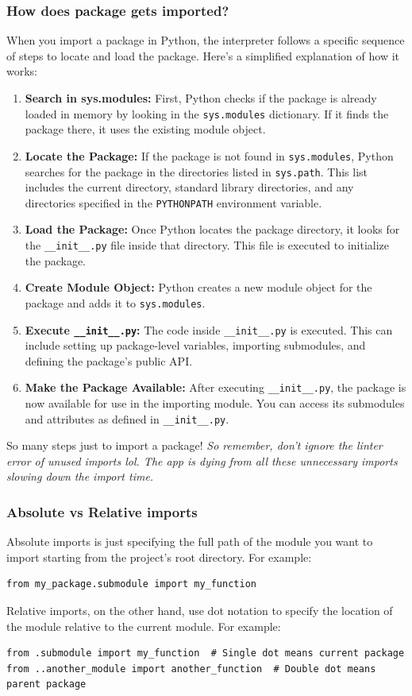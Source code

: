 \subsubsection{How does package gets imported?}
When you import a package in Python, the interpreter follows a specific sequence of steps to locate and load the package. Here's a simplified explanation of how it works:
\begin{enumerate}
    \item \textbf{Search in sys.modules:} First, Python checks if the package is already loaded in memory by looking in the \texttt{sys.modules} dictionary. If it finds the package there, it uses the existing module object.
    \item \textbf{Locate the Package:} If the package is not found in \texttt{sys.modules}, Python searches for the package in the directories listed in \texttt{sys.path}. This list includes the current directory, standard library directories, and any directories specified in the \texttt{PYTHONPATH} environment variable.
    \item \textbf{Load the Package:} Once Python locates the package directory, it looks for the \texttt{\_\_init\_\_.py} file inside that directory. This file is executed to initialize the package.
    \item \textbf{Create Module Object:} Python creates a new module object for the package and adds it to \texttt{sys.modules}.
    \item \textbf{Execute \texttt{\_\_init\_\_.py}:} The code inside \texttt{\_\_init\_\_.py} is executed. This can include setting up package-level variables, importing submodules, and defining the package's public API.
    \item \textbf{Make the Package Available:} After executing \texttt{\_\_init\_\_.py}, the package is now available for use in the importing module. You can access its submodules and attributes as defined in \texttt{\_\_init\_\_.py}.
\end{enumerate}

So many steps just to import a package! \textit{So remember, don't ignore the linter error of unused imports lol. The app is dying from all these unnecessary imports slowing down the import time.}

\subsubsection{Absolute vs Relative imports}
Absolute imports is just specifying the full path of the module you want to import starting from the project's root directory. For example:
\begin{lstlisting}[caption=Absolute Import Example]
from my_package.submodule import my_function
\end{lstlisting}
Relative imports, on the other hand, use dot notation to specify the location of the module relative to the current module. For example:
\begin{lstlisting}[caption=Relative Import Example]
from .submodule import my_function  # Single dot means current package
from ..another_module import another_function  # Double dot means parent package
\end{lstlisting}

